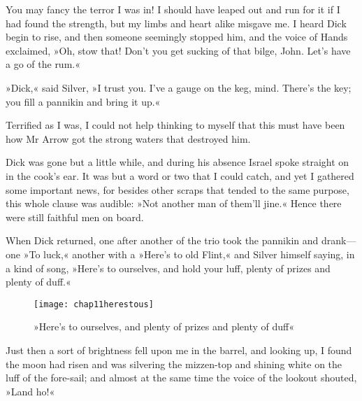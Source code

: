 You may fancy the terror I was in! I should have leaped out and run for it if I had found the strength, but my limbs and heart alike misgave me. I heard Dick begin to rise, and then someone seemingly stopped him, and the voice of Hands exclaimed, »Oh, stow that! Don't you get sucking of that bilge, John. Let's have a go of the rum.«

»Dick,« said Silver, »I trust you. I've a gauge on the keg, mind. There's the key; you fill a pannikin and bring it up.«

Terrified as I was, I could not help thinking to myself that this must have been how Mr Arrow got the strong waters that destroyed him.

Dick was gone but a little while, and during his absence Israel spoke straight on in the cook's ear. It was but a word or two that I could catch, and yet I gathered some important news, for besides other scraps that tended to the same purpose, this whole clause was audible: »Not another man of them'll jine.« Hence there were still faithful men on board.

When Dick returned, one after another of the trio took the pannikin and drank—one »To luck,« another with a »Here's to old Flint,« and Silver himself saying, in a kind of song, »Here's to ourselves, and hold your luff, plenty of prizes and plenty of duff.«

 \begin{figure}[p]
\centering
\texttt{[image: chap11herestous]}
\caption[»Here's to ourselves«]{»Here's to ourselves, and plenty of prizes and plenty of duff«}
\end{figure}

Just then a sort of brightness fell upon me in the barrel, and looking up, I found the moon had risen and was silvering the mizzen-top and shining white on the luff of the fore-sail; and almost at the same time the voice of the lookout shouted, »Land ho!«
